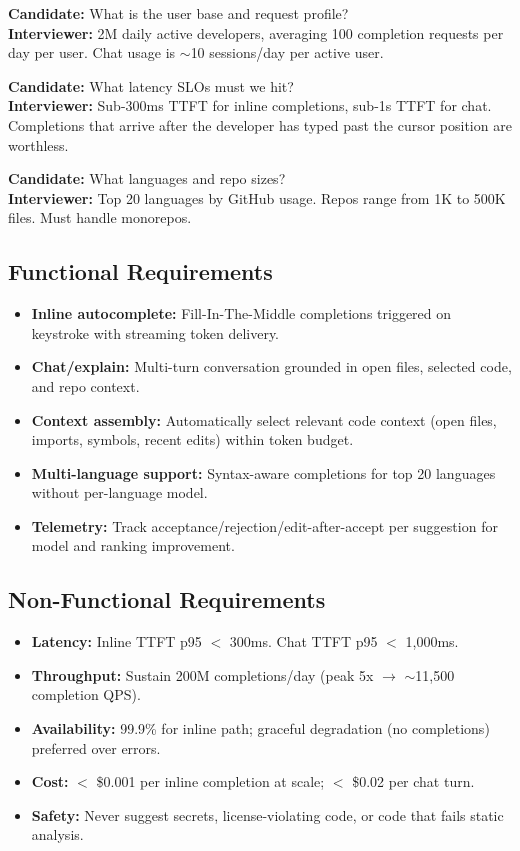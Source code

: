 \textbf{Candidate:} What is the user base and request profile?\\
\textbf{Interviewer:} 2M daily active developers, averaging 100 completion requests per day per user. Chat usage is $\sim$10 sessions/day per active user.

\textbf{Candidate:} What latency SLOs must we hit?\\
\textbf{Interviewer:} Sub-300ms TTFT for inline completions, sub-1s TTFT for chat. Completions that arrive after the developer has typed past the cursor position are worthless.

\textbf{Candidate:} What languages and repo sizes?\\
\textbf{Interviewer:} Top 20 languages by GitHub usage. Repos range from 1K to 500K files. Must handle monorepos.

\subsection*{Functional Requirements}

\begin{itemize}
  \item \textbf{Inline autocomplete:} Fill-In-The-Middle completions triggered on keystroke with streaming token delivery.
  \item \textbf{Chat/explain:} Multi-turn conversation grounded in open files, selected code, and repo context.
  \item \textbf{Context assembly:} Automatically select relevant code context (open files, imports, symbols, recent edits) within token budget.
  \item \textbf{Multi-language support:} Syntax-aware completions for top 20 languages without per-language model.
  \item \textbf{Telemetry:} Track acceptance/rejection/edit-after-accept per suggestion for model and ranking improvement.
\end{itemize}

\subsection*{Non-Functional Requirements}

\begin{itemize}
  \item \textbf{Latency:} Inline TTFT p95 $<$ 300ms. Chat TTFT p95 $<$ 1,000ms.
  \item \textbf{Throughput:} Sustain 200M completions/day (peak 5x $\rightarrow$ $\sim$11,500 completion QPS).
  \item \textbf{Availability:} 99.9\% for inline path; graceful degradation (no completions) preferred over errors.
  \item \textbf{Cost:} $<$ \$0.001 per inline completion at scale; $<$ \$0.02 per chat turn.
  \item \textbf{Safety:} Never suggest secrets, license-violating code, or code that fails static analysis.
\end{itemize}

